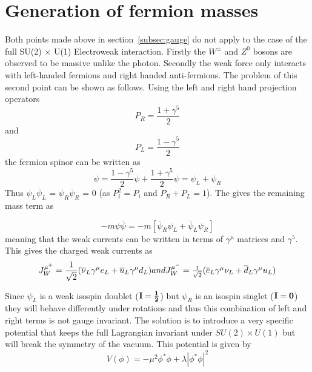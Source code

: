 \section{Generation of fermion masses}
Both points made above in section~\ref{subsec:gauge} do not apply to the case of the full SU(2) $\times$ U(1) Electroweak interaction. Firstly the $W^{\pm}$ and $Z^{0}$ bosons are observed to be massive unlike the photon. Secondly the weak force only interacts with left-handed fermions and right handed anti-fermions. The problem of this second point can be shown as follows. Using the left and right hand projection operators
\begin{equation}
  P_{R} = \frac{1+\gamma^{5}}{2}
\end{equation}
and
\begin{equation}
  P_{L} = \frac{1-\gamma^{5}}{2}
\end{equation}
the fermion spinor can be written as
\begin{equation}
\psi = \frac{1-\gamma^{5}}{2}\psi + \frac{1+\gamma^{5}}{2}\psi = \psi_{L}+\psi_{R}
\end{equation}
Thus $\psi_{L}\overline{\psi}_{L}$ = $\psi_{R}\overline{\psi}_{R}$ = 0 (as $P_{i}^{2} = P_{i}$ and $P_{R} + P_{L} = 1$). The gives the remaining mass term as

\begin{equation}
  -m\psi\overline{\psi} = -m[\overline{\psi}_{R}\psi_{L} + \overline{\psi}_{L}\psi_{R}]
\end{equation}
meaning that the weak currents can be written in terms of $\gamma^{\mu}$ matrices and $\gamma^{5}$. This gives the charged weak currents as
\begin{equation}
    J_{W}^{\mu^{+}} = \frac{1}{\sqrt{2}}(\overline{\nu}_{L}\gamma^{\mu}e_{L} + \overline{u}_{L}\gamma^{\mu}d_{L}) $$and$$ J_{W}^{\mu^{-}} = \frac{1}{\sqrt{2}}(\overline{e}_{L}\gamma^{\mu}\nu_{L} + \overline{d}_{L}\gamma^{\mu}u_{L})
    \label{eq:chargedcurr}
\end{equation}


Since $\psi_{L}$ is a weak isospin doublet ($\bf{I}=\frac{1}{2}$) but $\psi_{R}$ is an isospin singlet ($\bf{I}=0$) they will behave differently under rotations and thus this combination of left and right terms is not gauge invariant.
The solution is to introduce a very specific potential that keeps the full Lagrangian invariant under $SU(2)\times U(1)$ but will break the symmetry of the vacuum.
This potential is given by
\begin{equation}
  V(\phi) = -\mu^{2}\phi^{*}\phi +\lambda|\phi^{*}\phi|^{2}
\end{equation}

